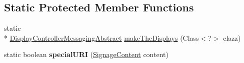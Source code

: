 \subsection*{Static Protected Member Functions}
\begin{DoxyCompactItemize}
\item 
static \\*
\hyperlink{classgov_1_1fnal_1_1ppd_1_1dd_1_1display_1_1client_1_1DisplayControllerMessagingAbstract}{Display\-Controller\-Messaging\-Abstract} \hyperlink{classgov_1_1fnal_1_1ppd_1_1dd_1_1display_1_1client_1_1DisplayControllerMessagingAbstract_ad405437545b641b1c4d00d2267209376}{make\-The\-Displays} (Class$<$?$>$ clazz)
\item 
\hypertarget{classgov_1_1fnal_1_1ppd_1_1dd_1_1display_1_1client_1_1DisplayControllerMessagingAbstract_a78a7e10e4def66421424bd02c69611ab}{static boolean {\bfseries special\-U\-R\-I} (\hyperlink{interfacegov_1_1fnal_1_1ppd_1_1dd_1_1signage_1_1SignageContent}{Signage\-Content} content)}\label{classgov_1_1fnal_1_1ppd_1_1dd_1_1display_1_1client_1_1DisplayControllerMessagingAbstract_a78a7e10e4def66421424bd02c69611ab}

\end{DoxyCompactItemize}
